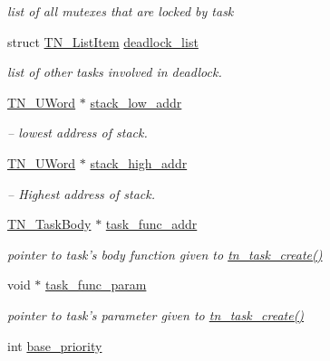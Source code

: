 \begin{DoxyCompactItemize}
\begin{DoxyCompactList}\small\item\em list of all mutexes that are locked by task \end{DoxyCompactList}\item 
struct \hyperlink{structTN__ListItem}{T\+N\+\_\+\+List\+Item} \hyperlink{structTN__Task_a097e79851e01fb3c73f0346d99ea8b7e}{deadlock\+\_\+list}
\begin{DoxyCompactList}\small\item\em list of other tasks involved in deadlock. \end{DoxyCompactList}\item 
\hyperlink{tn__arch__example_8h_ab80cba0fe9ffcd9011d53dfeb9e39bf4}{T\+N\+\_\+\+U\+Word} $\ast$ \hyperlink{structTN__Task_a05cfde00b0cd82cda88a6698dc159e31}{stack\+\_\+low\+\_\+addr}
\begin{DoxyCompactList}\small\item\em -- lowest address of stack. \end{DoxyCompactList}\item 
\hyperlink{tn__arch__example_8h_ab80cba0fe9ffcd9011d53dfeb9e39bf4}{T\+N\+\_\+\+U\+Word} $\ast$ \hyperlink{structTN__Task_a4497d6972b9a7706608708847d29aa46}{stack\+\_\+high\+\_\+addr}
\begin{DoxyCompactList}\small\item\em -- Highest address of stack. \end{DoxyCompactList}\item 
\hypertarget{structTN__Task_a69c06e09b4d2a8a258f0733b58324139}{\hyperlink{tn__common_8h_a82f7de9034cbbb373c4dbcff45942343}{T\+N\+\_\+\+Task\+Body} $\ast$ \hyperlink{structTN__Task_a69c06e09b4d2a8a258f0733b58324139}{task\+\_\+func\+\_\+addr}}\label{structTN__Task_a69c06e09b4d2a8a258f0733b58324139}

\begin{DoxyCompactList}\small\item\em pointer to task's body function given to {\ttfamily \hyperlink{tn__tasks_8h_a548d5adda09d1b4e393b5df0e9e1a7a5}{tn\+\_\+task\+\_\+create()}} \end{DoxyCompactList}\item 
\hypertarget{structTN__Task_a55c62af79c5b4fdc2f1b414d409afe73}{void $\ast$ \hyperlink{structTN__Task_a55c62af79c5b4fdc2f1b414d409afe73}{task\+\_\+func\+\_\+param}}\label{structTN__Task_a55c62af79c5b4fdc2f1b414d409afe73}

\begin{DoxyCompactList}\small\item\em pointer to task's parameter given to {\ttfamily \hyperlink{tn__tasks_8h_a548d5adda09d1b4e393b5df0e9e1a7a5}{tn\+\_\+task\+\_\+create()}} \end{DoxyCompactList}\item 
\hypertarget{structTN__Task_a7775b785b3f0b57918e9a0c88491a069}{int \hyperlink{structTN__Task_a7775b785b3f0b57918e9a0c88491a069}{base\+\_\+priority}}\label{structTN__Task_a7775b785b3f0b57918e9a0c88491a069}


\end{DoxyCompactItemize}
